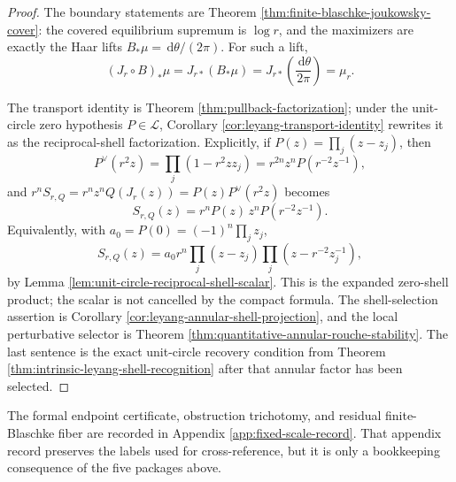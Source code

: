 \documentclass[12pt,a4paper]{article}
\theoremstyle{plain}
\theoremstyle{definition}
\numberwithin{equation}{section}
\newcommand{\dd}{\,\mathrm{d}}
\begin{document}
\begin{proof}
The boundary statements are Theorem
\ref{thm:finite-blaschke-joukowsky-cover}: the covered equilibrium
supremum is \(\log r\), and the maximizers are exactly the Haar lifts
\(B_\ast\mu=\dd\theta/(2\pi)\).  For such a lift,
\[
(J_r\circ B)_\ast\mu
=J_{r\ast}(B_\ast\mu)
=J_{r\ast}\!\left(\frac{\dd\theta}{2\pi}\right)
=\mu_r.
\]

The transport identity is Theorem \ref{thm:pullback-factorization}; under
the unit-circle zero hypothesis \(P\in\mathcal L\), Corollary
\ref{cor:leyang-transport-identity} rewrites it as the reciprocal-shell
factorization.  Explicitly, if \(P(z)=\prod_j(z-z_j)\), then
\[
P^\vee(r^2z)=\prod_j(1-r^2zz_j)
=r^{2n}z^nP(r^{-2}z^{-1}),
\]
and \(r^nS_{r,Q}=r^nz^nQ(J_r(z))=P(z)P^\vee(r^2z)\) becomes
\[
S_{r,Q}(z)=r^nP(z)\,z^nP(r^{-2}z^{-1}).
\]
Equivalently, with \(a_0=P(0)=(-1)^n\prod_jz_j\),
\[
S_{r,Q}(z)
=a_0r^n\prod_j(z-z_j)\prod_j(z-r^{-2}z_j^{-1}),
\]
by Lemma \ref{lem:unit-circle-reciprocal-shell-scalar}.  This is the
expanded zero-shell product; the scalar is not cancelled by the compact
formula.
The shell-selection assertion is Corollary
\ref{cor:leyang-annular-shell-projection}, and the local perturbative
selector is Theorem \ref{thm:quantitative-annular-rouche-stability}.  The
last sentence is the exact unit-circle recovery condition from Theorem
\ref{thm:intrinsic-leyang-shell-recognition} after that annular factor has
been selected.
\end{proof}

The formal endpoint certificate, obstruction trichotomy, and residual
finite-Blaschke fiber are recorded in Appendix
\ref{app:fixed-scale-record}.  That appendix record preserves the
labels used for cross-reference, but it is only a bookkeeping
consequence of the five packages above.
\end{document}
